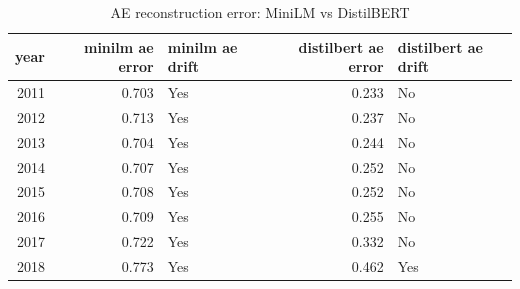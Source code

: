 \begin{table}[ht]
\centering
\caption{AE reconstruction error: MiniLM vs DistilBERT}
\label{tab:minilm_vs_distilbert_ae}
\begin{tabular}{rrlrl}
\toprule
year & minilm ae error & minilm ae drift & distilbert ae error & distilbert ae drift \\
\midrule
2011 & 0.703 & Yes & 0.233 & No \\
2012 & 0.713 & Yes & 0.237 & No \\
2013 & 0.704 & Yes & 0.244 & No \\
2014 & 0.707 & Yes & 0.252 & No \\
2015 & 0.708 & Yes & 0.252 & No \\
2016 & 0.709 & Yes & 0.255 & No \\
2017 & 0.722 & Yes & 0.332 & No \\
2018 & 0.773 & Yes & 0.462 & Yes \\
\bottomrule
\end{tabular}
\end{table}
